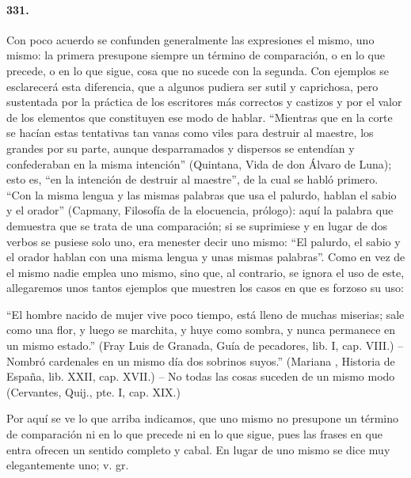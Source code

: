 \documentclass{book}
\begin{document}
\paragraph{331.} Con poco acuerdo se confunden generalmente las expresiones el mismo, uno mismo: la primera presupone siempre un término de comparación, o en lo que precede, o en lo que sigue, cosa que no sucede con la segunda. Con ejemplos se esclarecerá esta diferencia, que a algunos pudiera ser sutil y caprichosa, pero sustentada por la práctica de los escritores más correctos y castizos y por el valor de los elementos que constituyen ese modo de hablar.
“Mientras que en la corte se hacían estas tentativas tan vanas como viles para destruir al maestre, los grandes por su parte, aunque desparramados y dispersos se entendían y confederaban en la misma intención” (Quintana, Vida de don Álvaro de Luna); esto es, “en la intención de destruir al maestre”, de la cual se habló primero.
“Con la misma lengua y las mismas palabras que usa el palurdo, hablan el sabio y el orador” (Capmany, Filosofía de la elocuencia, prólogo): aquí la palabra que demuestra que se trata de una comparación; si se suprimiese y en lugar de dos verbos se pusiese solo uno, era menester decir uno mismo: “El palurdo, el sabio y el orador hablan con una misma lengua y unas mismas palabras”.
Como en vez de el mismo nadie emplea uno mismo, sino que, al contrario, se ignora el uso de este, allegaremos unos tantos ejemplos que muestren los casos en que es forzoso su uso:

“El hombre nacido de mujer vive poco tiempo, está lleno de muchas miserias; sale como una flor, y luego se marchita, y huye como sombra, y nunca permanece en un mismo estado.” (Fray Luis de Granada, Guía de pecadores, lib. I, cap. VIII.) – Nombró cardenales en un mismo día dos sobrinos suyos.” (Mariana , Historia de España, lib. XXII, cap. XVII.) – No todas las cosas suceden de un mismo modo (Cervantes, Quij., pte. I, cap. XIX.)

Por aquí se ve lo que arriba indicamos, que uno mismo no presupone un término de comparación ni en lo que precede ni en lo que sigue, pues las frases en que entra ofrecen un sentido completo y cabal.
En lugar de uno mismo se dice muy elegantemente uno; v. gr.
\end{document}
